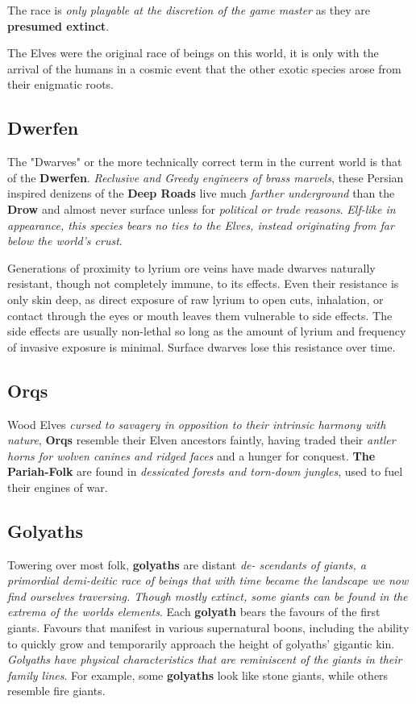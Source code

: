 \documentclass[letterpaper,twocolumn,openany,nodeprecatedcode,breakable,skins,xparse,most]{dndbook}
\begin{document}
The race is \textit{only playable at the discretion of the game master} as they are \textbf{presumed extinct}.

\begin{DndReadAloud}
   The Elves were the original race of beings on this world, it is only with the arrival of the humans in a cosmic event that the other exotic species arose from their enigmatic roots.
\end{DndReadAloud}

\subsection{Dwerfen}
The "Dwarves" or the more technically correct term in the current world is that of the \textbf{Dwerfen}. \textit{Reclusive and Greedy engineers of brass marvels}, these Persian inspired denizens of the \textbf{Deep Roads} live much \textit{farther underground} than the \textbf{Drow} and almost never surface unless for \textit{political or trade reasons}. \textit{Elf-like in appearance, this species bears no ties to the Elves, instead originating from far below the world's crust}.

Generations of proximity to lyrium ore veins have made dwarves naturally resistant, though not completely immune, to its effects. Even their resistance is only skin deep, as direct exposure of raw lyrium to open cuts, inhalation, or contact through the eyes or mouth leaves them vulnerable to side effects. The side effects are usually non-lethal so long as the amount of lyrium and frequency of invasive exposure is minimal. Surface dwarves lose this resistance over time.

\subsection{Orqs}
Wood Elves \textit{cursed to savagery in opposition to their intrinsic harmony with nature}, \textbf{Orqs} resemble their Elven ancestors faintly, having traded their \textit{antler horns for wolven canines and ridged faces} and a hunger for conquest.\textbf{ The Pariah-Folk} are found in \textit{dessicated forests and torn-down jungles}, used to fuel their engines of war.

\subsection{Golyaths}
Towering over most folk, \textbf{golyaths} are distant \textit{de-
scendants
of
giants, a primordial demi-deitic race of beings that with time became the landscape we now find ourselves traversing. Though mostly extinct, some giants can be found in the extrema of the worlds elements}. Each \textbf{golyath} bears the favours
of
the first
giants. Favours that
manifest in various
supernatural boons, including the ability to quickly
grow and temporarily approach the height
of
golyaths' gigantic kin.
\textit{Golyaths have physical characteristics that are
reminiscent
of
the giants in their family lines}. For
example, some \textbf{golyaths} look like stone giants, while
others resemble fire giants.
\end{document}
